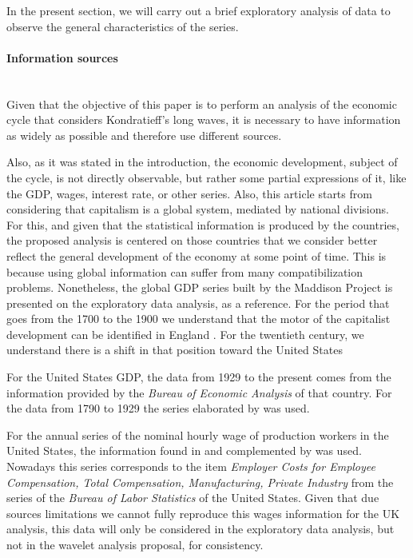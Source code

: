\documentclass[a4paper,10cpi]{article}
\begin{document}
	In the present section, we will carry out a brief exploratory analysis of data to observe the general characteristics of the series.
	
	\paragraph{Information sources}\mbox{} \\

	
	Given that the objective of this paper is to perform an analysis of the economic cycle that considers Kondratieff's long waves, it is necessary to have information as widely as possible and therefore use different sources.
	
	Also, as it was stated in the introduction, the economic development, subject of the cycle, is not directly observable, but rather some partial expressions of it, like the GDP, wages, interest rate, or other series. Also, this article starts from considering that capitalism is a global system, mediated by national divisions. For this, and given that the statistical information is produced by the countries, the proposed analysis is centered on those countries that we consider better reflect the general development of the economy at some point of time. This is because using global information can suffer from many compatibilization problems. Nonetheless, the global GDP series built by the Maddison Project \citep{bolt2014} is presented on the exploratory data analysis, as a reference. For the period that goes from the 1700 to the 1900 we understand that the motor of the capitalist development can be identified in England  \citep{horn2010reconceptualizing}. For the twentieth century, we understand there is a shift in that position toward the United States \citep{arrighi1994long}
	
	
	For the United States GDP, the data from 1929 to the present comes from the information provided by the \textit{Bureau of Economic Analysis} of that country. For the data from 1790 to 1929 the series elaborated by \cite{johnston2018us} was used.
	
	For the annual series of the nominal hourly wage of production workers in the United States, the information found in \cite{officer2009two} and complemented by \cite{Roesch2018} was used. Nowadays this series corresponds to the item \textit{Employer Costs for Employee Compensation, Total Compensation, Manufacturing, Private Industry} from the series of the \textit{Bureau of Labor Statistics} of the United States. Given that due sources limitations we cannot fully reproduce this wages information for the UK analysis, this data will only be considered in the exploratory data analysis, but not in the wavelet analysis proposal, for consistency.
	
\end{document}
